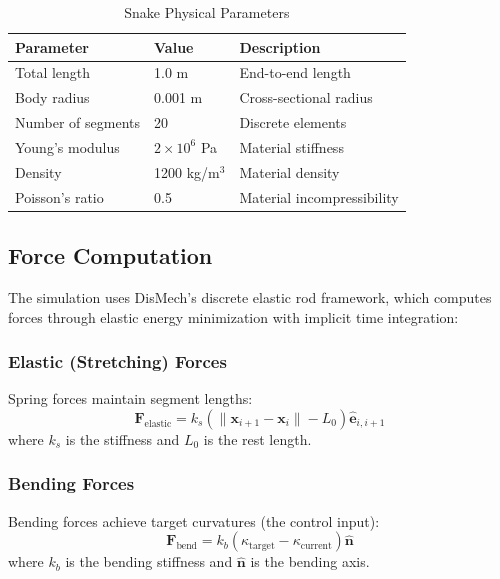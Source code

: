 \documentclass[11pt]{article}
\begin{document}
\begin{table}[H]
\centering
\caption{Snake Physical Parameters}
\begin{tabular}{@{}lll@{}}
\toprule
\textbf{Parameter} & \textbf{Value} & \textbf{Description} \\
\midrule
Total length & 1.0 m & End-to-end length \\
Body radius & 0.001 m & Cross-sectional radius \\
Number of segments & 20 & Discrete elements \\
Young's modulus & $2 \times 10^6$ Pa & Material stiffness \\
Density & 1200 kg/m$^3$ & Material density \\
Poisson's ratio & 0.5 & Material incompressibility \\
\bottomrule
\end{tabular}
\end{table}

\subsection{Force Computation}

The simulation uses DisMech's discrete elastic rod framework, which computes forces through elastic energy minimization with implicit time integration:

\subsubsection{Elastic (Stretching) Forces}

Spring forces maintain segment lengths:
\begin{equation}
    \mathbf{F}_{\text{elastic}} = k_s (\|\mathbf{x}_{i+1} - \mathbf{x}_i\| - L_0) \hat{\mathbf{e}}_{i,i+1}
\end{equation}
where $k_s$ is the stiffness and $L_0$ is the rest length.

\subsubsection{Bending Forces}

Bending forces achieve target curvatures (the control input):
\begin{equation}
    \mathbf{F}_{\text{bend}} = k_b (\kappa_{\text{target}} - \kappa_{\text{current}}) \hat{\mathbf{n}}
\end{equation}
where $k_b$ is the bending stiffness and $\hat{\mathbf{n}}$ is the bending axis.
\end{document}
